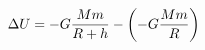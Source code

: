 \documentclass[preview]{standalone}
\begin{document}
\begin{align*}
\special{dvisvgm:raw <g id='unique000'>}\Delta U = -G\frac{Mm}{R+h} - \left( -G\frac{Mm}{R} \right)\special{dvisvgm:raw </g>}
\end{align*}
\end{document}

